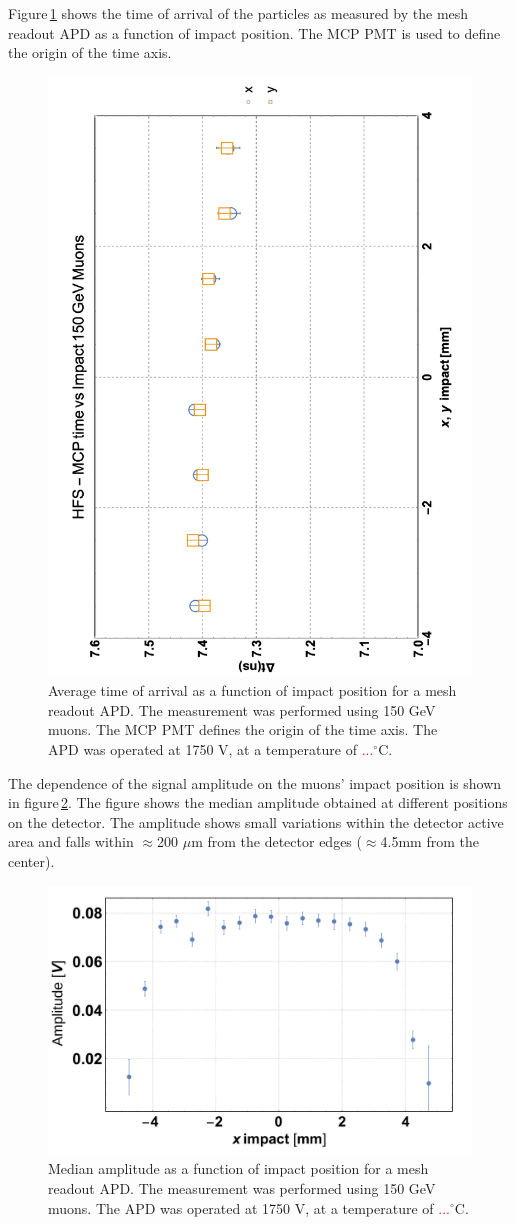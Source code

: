 \documentclass{article}
\begin{document}
Figure\,\ref{fig:toa8x8impact} shows the time of arrival of the particles as measured by the mesh readout APD as a function of impact position.
The MCP PMT is used to define the origin of the time axis.
\begin{figure}
  \centering
  \includegraphics[width = 0.6 \textwidth]{toa8x8VsImpact}
  \caption{Average time of arrival as a function of impact position for a mesh readout APD. The measurement was performed using 150 GeV muons. The MCP PMT defines the origin of the time axis. The APD was operated at 1750 V, at a temperature of \textcolor{red}{...}$^\circ$C.}
  \label{fig:toa8x8impact}
\end{figure}

The dependence of the signal amplitude on the muons' impact position is shown in figure\,\ref{fig:ampli8x8impact}.
The figure shows the median amplitude obtained at different positions on the detector.
The amplitude shows small variations within the detector active area and falls within $\approx$200 $\mu$m from the detector edges ($\approx$4.5mm from the center).
\begin{figure}
  \centering
  \includegraphics[width = 0.6 \textwidth]{ampli8x8vsImpact}
  \caption{Median amplitude as a function of impact position for a mesh readout APD. The measurement was performed using 150 GeV muons. The APD was operated at 1750 V, at a temperature of \textcolor{red}{...}$^\circ$C.}
  \label{fig:ampli8x8impact}
\end{figure}
\end{document}
